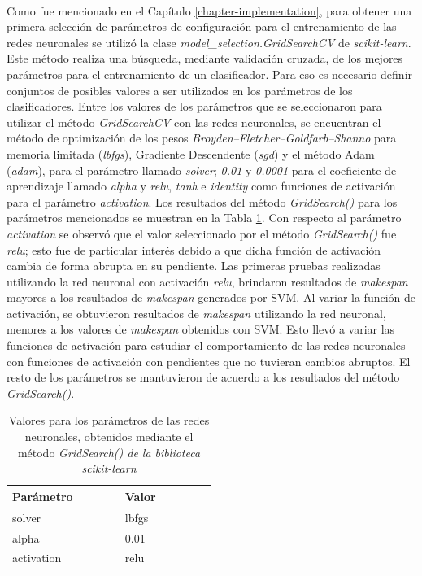 \paragraph{} Como fue mencionado en el Capítulo \ref{chapter-implementation}, para obtener una primera selección de parámetros de configuración para el entrenamiento de las redes neuronales se utilizó la clase \textit{model\_selection.GridSearchCV} de \textit{scikit-learn}.
Este método realiza una búsqueda, mediante validación cruzada, de los mejores parámetros para el entrenamiento de un clasificador.
Para eso es necesario definir conjuntos de posibles valores a ser utilizados en los parámetros de los clasificadores.
Entre los valores de los parámetros que se seleccionaron para utilizar el método \textit{GridSearchCV} con las redes neuronales, se encuentran el método de optimización de los pesos \textit{Broyden–Fletcher–Goldfarb–Shanno} para memoria limitada (\textit{lbfgs}), Gradiente Descendente (\textit{sgd}) y el método Adam (\textit{adam}), para el parámetro llamado \textit{solver}; \textit{0.01} y \textit{0.0001} para el coeficiente de aprendizaje llamado \textit{alpha} y \textit{relu}, \textit{tanh} e \textit{identity} como funciones de activación para el parámetro \textit{activation}.
Los resultados del método \textit{GridSearch()} para los parámetros mencionados se muestran en la Tabla \ref{table:parametros}.
Con respecto al parámetro \textit{activation} se observó que el valor seleccionado por el método \textit{GridSearch()} fue \textit{relu}; esto fue de particular interés debido a que dicha función de activación cambia de forma abrupta en su pendiente. Las primeras pruebas realizadas utilizando la red neuronal con activación \textit{relu}, brindaron resultados de \textit{makespan} mayores a los resultados de \textit{makespan} generados por SVM. Al variar la función de activación, se obtuvieron resultados de \textit{makespan} utilizando la red neuronal, menores a los valores de \textit{makespan} obtenidos con SVM.
Esto llevó a variar las funciones de activación para estudiar el comportamiento de las redes neuronales con funciones de activación con pendientes que no tuvieran cambios abruptos.
El resto de los parámetros se mantuvieron de acuerdo a los resultados del método \textit{GridSearch()}.

\begin{table}[h!]
\centering
\begin{tabular}{ |p{0.25\linewidth}|p{0.25\linewidth}| } 
\hline
\textbf{Parámetro} & \textbf{Valor}\\
\hline
solver & lbfgs\\ 
\hline
alpha & 0.01\\ 
\hline
activation & relu\\ 
\hline
\end{tabular}
\caption{ Valores para los parámetros de las redes neuronales, obtenidos mediante el método \textit{GridSearch() de la biblioteca \textit{scikit-learn}}}
\label{table:parametros}
\end{table}

